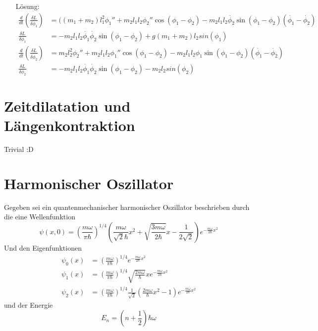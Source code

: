 \documentclass{scrartcl}
\begin{document}
\begin{enumerate}[a)]
\item[Lösung:]
\begin{align*}
\frac{d}{dt}(\frac{\delta L}{\delta\dot{\phi_1}}) &= ((m_1 + m_2)l_1^2\phi_1'' + m_2l_1l_2\phi_2''\cos(\phi_1 - \phi_2) - m_2l_1l_2\dot{\phi_2}\sin(\phi_1 - \phi_2)(\dot{\phi_1} - \dot{\phi_2}) \\
\frac{\delta L}{\delta \phi_1} &= -m_2l_1l_2\dot{\phi_1}\dot{\phi_2}\sin(\phi_1 - \phi_2) + g(m_1 + m_2)l_2sin(\phi_1) \\
\frac{d}{dt}(\frac{\delta L}{\delta\dot{\phi_2}}) &= m_2l_2^2\phi_2'' + m_2l_1l_2\phi_1''\cos(\phi_1 - \phi_2) - m_2l_1l_2\phi_1\sin(\phi_1 - \phi_2)(\dot{\phi_1} - \dot{\phi_2}) \\
\frac{\delta L}{\delta \phi_2} &= -m_2l_1l_2\dot{\phi_1}\dot{\phi_2}\sin(\phi_1 - \phi_2) - m_2l_2sin(\phi_2)
\end{align*}
\end{enumerate}
\section{Zeitdilatation und Längenkontraktion}
Trivial :D
\section{Harmonischer Oszillator}

Gegeben sei ein quantenmechanischer harmonischer Oszillator beschrieben durch die eine Wellenfunktion
\[\psi(x,0)=\left(\frac{m\omega}{\pi \hbar}\right)^{1/4}\left(\frac{m\omega}{\sqrt 2 \hbar}x^2+\sqrt{\frac{3m\omega}{2\hbar}}x-\frac{1}{2\sqrt 2}\right)e^{-\frac{m\omega}{2\hbar}x^2}\]
Und den Eigenfunktionen
\begin{align*}
\psi_0(x)	&=\left(\frac{m\omega}{\pi\hbar}\right)^{1/4}e^{-\frac{m\omega}{2\hbar}x^2}	\\
\psi_1(x)	&=\left(\frac{m\omega}{\pi\hbar}\right)^{1/4}\sqrt{\frac{2m\omega}{\hbar}}xe^{-\frac{m\omega}{2\hbar}x^2}	\\
\psi_2(x)	&=\left(\frac{m\omega}{\pi\hbar}\right)^{1/4}\frac{1}{\sqrt 2}\left(\frac{2m\omega}{\hbar}x^2-1\right)e^{-\frac{m\omega}{2\hbar}x^2}
\end{align*}
und der Energie 
\[E_n =\left(n+\frac{1}{2}\right)\hbar\omega\]
\end{document}
